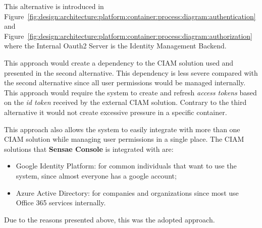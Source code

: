 This alternative is introduced in Figure~\ref{fig:design:architecture:platform:container:process:diagram:authentication} and Figure~\ref{fig:design:architecture:platform:container:process:diagram:authorization} where the Internal Oauth2 Server is the Identity Management Backend.

This approach would create a dependency to the \gls{CIAM} solution used and presented in the second alternative. This dependency is less severe compared with the second alternative since all user permissions would be managed internally.
This approach would require the system to create and refresh \textit{access tokens} based on the \textit{id token} received by the external \gls{CIAM} solution. Contrary to the third alternative it would not create excessive pressure in a specific container.

This approach also allows the system to easily integrate with more than one \gls{CIAM} solution while managing user permissions in a single place. The \gls{CIAM} solutions that \textbf{Sensae Console} is integrated with are:

\begin{itemize}
   \item Google Identity Platform: for common individuals that want to use the system, since almost everyone has a google account;
   \item Azure Active Directory: for companies and organizations since most use Office 365 services internally.
\end{itemize}

Due to the reasons presented above, this was the adopted approach.
